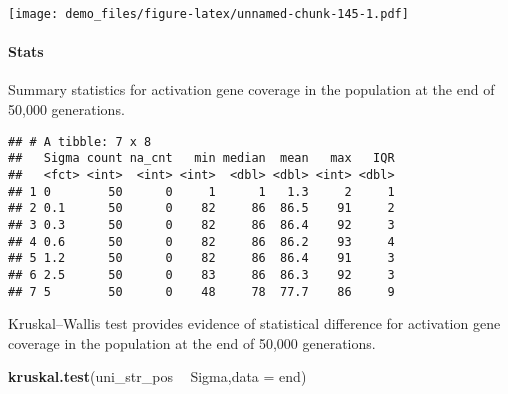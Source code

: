 \documentclass[]{book}
\newenvironment{Shaded}{\begin{snugshade}}{\end{snugshade}}
\newcommand{\DataTypeTok}[1]{\textcolor[rgb]{0.13,0.29,0.53}{#1}}
\newcommand{\KeywordTok}[1]{\textcolor[rgb]{0.13,0.29,0.53}{\textbf{#1}}}
\newcommand{\NormalTok}[1]{#1}
\newcommand{\OperatorTok}[1]{\textcolor[rgb]{0.81,0.36,0.00}{\textbf{#1}}}
\newcommand{\OtherTok}[1]{\textcolor[rgb]{0.56,0.35,0.01}{#1}}
\newcommand{\StringTok}[1]{\textcolor[rgb]{0.31,0.60,0.02}{#1}}
\let\oldparagraph\paragraph
\renewcommand{\paragraph}[1]{\oldparagraph{#1}\mbox{}}
\begin{document}
\texttt{[image: demo\_files/figure-latex/unnamed-chunk-145-1.pdf]}

\hypertarget{stats-69}{%
\paragraph{Stats}\label{stats-69}}

Summary statistics for activation gene coverage in the population at the end of 50,000 generations.

\begin{Shaded}
\end{Shaded}

\begin{verbatim}
## # A tibble: 7 x 8
##   Sigma count na_cnt   min median  mean   max   IQR
##   <fct> <int>  <int> <int>  <dbl> <dbl> <int> <dbl>
## 1 0        50      0     1      1   1.3     2     1
## 2 0.1      50      0    82     86  86.5    91     2
## 3 0.3      50      0    82     86  86.4    92     3
## 4 0.6      50      0    82     86  86.2    93     4
## 5 1.2      50      0    82     86  86.4    91     3
## 6 2.5      50      0    83     86  86.3    92     3
## 7 5        50      0    48     78  77.7    86     9
\end{verbatim}

Kruskal--Wallis test provides evidence of statistical difference for activation gene coverage in the population at the end of 50,000 generations.

\begin{Shaded}
\begin{Highlighting}[]
\KeywordTok{kruskal.test}\NormalTok{(uni_str_pos }\OperatorTok{~}\StringTok{ }\NormalTok{Sigma,}\DataTypeTok{data =}\NormalTok{ end)}
\end{Highlighting}
\end{Shaded}
\end{document}
